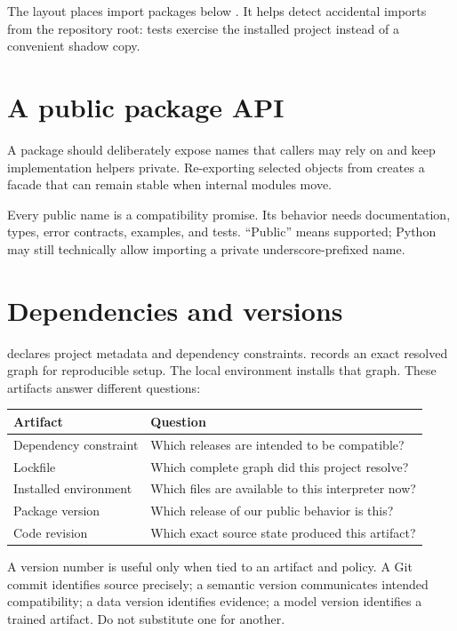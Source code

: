 The  layout places import packages below . It helps detect
accidental imports from the repository root: tests exercise the installed
project instead of a convenient shadow copy.

\section{A public package API}

A package should deliberately expose names that callers may rely on and keep
implementation helpers private. Re-exporting selected objects from
 creates a facade that can remain stable when
internal modules move.

Every public name is a compatibility promise. Its behavior needs documentation,
types, error contracts, examples, and tests. ``Public'' means supported; Python
may still technically allow importing a private underscore-prefixed name.

\section{Dependencies and versions}

 declares project metadata and dependency constraints.
 records an exact resolved graph for reproducible setup. The local
environment installs that graph. These artifacts answer different questions:

\begin{tabularx}{\textwidth}{@{}p{}X@{}}
\toprule
Artifact & Question \\
\midrule
Dependency constraint & Which releases are intended to be compatible? \\
Lockfile & Which complete graph did this project resolve? \\
Installed environment & Which files are available to this interpreter now? \\
Package version & Which release of our public behavior is this? \\
Code revision & Which exact source state produced this artifact? \\
\bottomrule
\end{tabularx}

A version number is useful only when tied to an artifact and policy. A Git
commit identifies source precisely; a semantic version communicates intended
compatibility; a data version identifies evidence; a model version identifies a
trained artifact. Do not substitute one for another.

